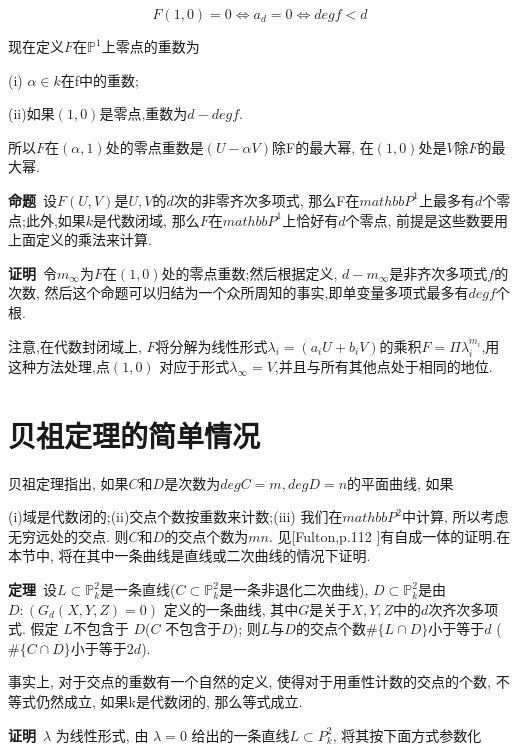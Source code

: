 \documentclass[UTF8]{book}
\begin{document}
		\begin{equation*}
			F(1,0)=0\Leftrightarrow a_{d}=0\Leftrightarrow deg f<d
		\end{equation*}
		
		现在定义$ F $在$\mathbb{P}^{1}$上零点的重数为
		
		
		(i) $\alpha \in k$在f中的重数;
		
		
		(ii)如果$ (1,0) $是零点,重数为$ d-deg f $.
		
		
		所以$ F $在$ (\alpha,1) $处的零点重数是$ (U-\alpha V) $除F的最大幂, 在$ (1,0) $处是$ V $除$ F $的最大幂.
		
	
		\textbf{命题}\ 设$ F(U,V) $是$ U,V $的$ d $次的非零齐次多项式, 那么F在$mathbb{P}^{1}$上最多有$ d $个零点;此外,如果$ k $是代数闭域, 那么$ F $在$mathbb{P}^{1}$上恰好有$ d $个零点, 前提是这些数要用上面定义的乘法来计算.
		
		
		\textbf{证明}\ 令$m_{\infty}$为$ F $在$ (1,0) $处的零点重数;然后根据定义, $d-m_{\infty}$是非齐次多项式$ f $的次数, 然后这个命题可以归结为一个众所周知的事实,即单变量多项式最多有$ deg f $个根.
		
		
		注意,在代数封闭域上, $ F $将分解为线性形式$\lambda_{i}=(a_{i}U+b_{i}V)$的乘积$F=\Pi\lambda_{i}^{m_{i}}$,用这种方法处理,点$ (1,0) $ 对应于形式$\lambda_{\infty}=V$,并且与所有其他点处于相同的地位.
	\section{贝祖定理的简单情况}
		贝祖定理指出, 如果$ C $和$ D $是次数为$ deg C=m, deg D=n $的平面曲线, 如果
		
		
		(i)域是代数闭的;(ii)交点个数按重数来计数;(iii) 我们在$mathbb{P}^{2}$中计算, 所以考虑无穷远处的交点. 则$ C $和$ D $的交点个数为$ mn $. 见[Fulton,p.112 ]有自成一体的证明.在本节中, 将在其中一条曲线是直线或二次曲线的情况下证明.
		
		
		\textbf{定理}\ 设$L\subset \mathbb{P}^{2}_{k}$是一条直线($C\subset \mathbb{P}^{2}_{k}$是一条非退化二次曲线), $D\subset \mathbb{P}^{2}_{k}$是由$D:(G_{d}(X,Y,Z)=0)$ 定义的一条曲线, 其中$ G $是关于$ X, Y, Z $中的$ d $次齐次多项式. 假定 $ L $不包含于 $ D $($ C $ 不包含于$ D $); 则$ L $与$ D $的交点个数$\# \{L\cap D\}$小于等于$ d $ ($\# \{C\cap D\}$小于等于$ 2d $).
		
		
		事实上, 对于交点的重数有一个自然的定义, 使得对于用重性计数的交点的个数, 不等式仍然成立, 如果k是代数闭的, 那么等式成立.
		
		
		\textbf{证明}\ $\lambda$ 为线性形式, 由 $\lambda=0$ 给出的一条直线$L\subset P^{2}_{k}$, 将其按下面方式参数化
		
\end{document}
